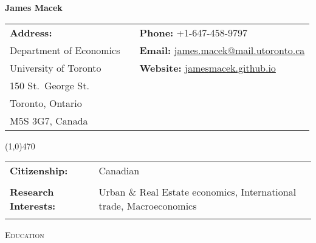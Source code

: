 \documentclass[11pt]{amsart}
\author{}
\begin{document}
\pagestyle{empty}
\setlength\parindent{0pt}

\Huge
\hspace*{\fill} \textbf{James Macek} \hspace*{\fill}
\normalsize
\vspace{1cm}

 \begin{tabular}{p{5cm} p{1cm} p{10cm}}
 \textbf{Address:}       &  & \textbf{Phone:} +1-647-458-9797                                                                                        \\
 Department of Economics &  & \textbf{Email:} \href{mailto:james.macek@mail.utoronto.ca}{james.macek@mail.utoronto.ca}                         \\
 University of Toronto   &  & \textbf{Website:} \href{https://jamesmacek.github.io}{jamesmacek.github.io}  \\
150 St.\ George St.       &  &                                                                                                                        \\
Toronto, Ontario         &  &                                                                                                                        \\
M5S 3G7, Canada          &  &                                                                                                                        
\end{tabular}

\line(1,0){470}


 \begin{tabular}{ p{4cm}  p{15cm}}
 \textbf{Citizenship:}           & Canadian                                     \\
                                 &                                              \\
\textbf{Research Interests:}     & Urban \& Real Estate economics,  International trade, Macroeconomics \\ 
                                 &                                           \\
\end{tabular}



\vspace{0.4cm}





\LARGE
\textsc{Education}
\vspace{0.2cm}
\end{document}
